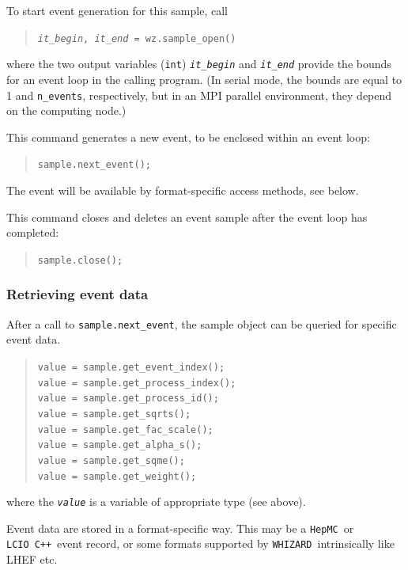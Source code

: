 \documentclass[12pt]{book}
\newcommand{\ttt}[1]{\texttt{#1}}
\newcommand{\whizard}{\ttt{WHIZARD}}
\newcommand{\lcio}{\ttt{LCIO}}
\newcommand{\hepmc}{\ttt{HepMC}}
\newcommand{\cpp}{\ttt{C++}}
\begin{document}
To start event generation for this sample, call
\begin{quote}
  \tt \textit{it\_begin}, \textit{it\_end} = wz.sample\_open()
\end{quote}
where the two output variables (\ttt{int}) \ttt{\it it\_begin} and
\ttt{\it it\_end}
provide the bounds for an event loop in the calling program.  (In serial mode,
the bounds are equal to 1 and \ttt{n\_events}, respectively, but in an MPI
parallel environment, they depend on the computing node.)

This command generates a new event, to be enclosed within an event loop:
\begin{quote}
  \tt sample.next\_event();
\end{quote}
The event will be available by format-specific access methods, see below.

This command closes and deletes an event sample after the event loop has
completed:
\begin{quote}
  \tt sample.close();
\end{quote}

\subsubsection{Retrieving event data}

After a call to \ttt{sample.next\_event}, the sample object can be
queried for specific event data.
\begin{quote}
  \tt value = sample.get\_event\_index();
  \\
  \tt value = sample.get\_process\_index();
  \\
  \tt value = sample.get\_process\_id();
  \\
  \tt value = sample.get\_sqrts();
  \\
  \tt value = sample.get\_fac\_scale();
  \\
  \tt value = sample.get\_alpha\_s();
  \\
  \tt value = sample.get\_sqme();
  \\
  \tt value = sample.get\_weight();
\end{quote}
where the \ttt{\it value} is a variable of appropriate type (see above).

Event data are stored in a format-specific way.  This may be a \hepmc\ or
\lcio\ \cpp\ event record, or some formats supported by
\whizard\ intrinsically like LHEF etc.

\end{document}

